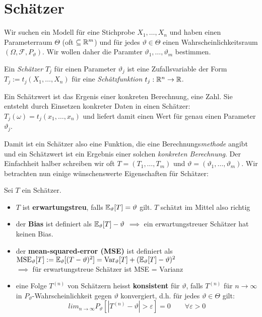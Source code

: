 \section{Schätzer}
\renewcommand{\theta}{\vartheta}
Wir suchen ein Modell für eine Stichprobe $X_1,\dots, X_n$ und haben einen Parameterraum $\Theta$ (oft $\subseteq \mathbb{R}^m$) und für jedes $\theta \in \Theta$ einen Wahrscheinlichkeitsraum $(\Omega, \mathcal{F}, P_\theta)$. Wir wollen daher die Paramter $\theta_1,\dots,\theta_m$ bestimmen.
\begin{definition}
Ein \textit{Schätzer} $T_j$ für einen Parameter $\theta_j$ ist eine Zufallsvariable der Form $T_j := t_j(X_1,\dots,X_n)$ für eine \textit{Schätzfunktion} $t_j: \mathbb{R}^n \to \mathbb{R}$.
\end{definition}
\begin{definition}
Ein Schätzwert ist das Ergenis einer konkreten Berechnung, eine Zahl. Sie entsteht durch Einsetzen konkreter Daten in einen Schätzer: $T_j(\omega) = t_j(x_1,\dots,x_n)$ und liefert damit einen Wert für genau einen Parameter $\theta_j$.
\end{definition}
Damit ist ein Schätzer also eine Funktion, die eine Berechnungs\textit{methode} angibt und ein Schätzwert ist ein Ergebnis einer solchen \textit{konkreten Berechnung}. Der Einfachheit halber schreiben wir oft $T = (T_1,\dots,T_m)$ und $\theta = (\theta_1,\dots,\theta_m)$. Wir betrachten nun einige wünschenswerte Eigenschaften für Schätzer:

\begin{definition}
Sei $T$ ein Schätzer.
\begin{itemize}
\item $T$ ist \textbf{erwartungstreu}, falls $\E_\theta [T] = \theta$ gilt. $T$ schätzt im Mittel also richtig
\item der \textbf{Bias} ist definiert als $\E_\theta [T] - \theta$
$\implies$ ein erwartungstreuer Schätzer hat keinen Bias.
\item der \textbf{mean-squared-error (MSE)} ist definiert als $\mathrm{MSE}_\theta [T] := \E_\theta [(T-\theta)^2] = \mathrm{Var}_\theta[T] + (\E_\theta[T] - \theta)^2$\\
$\implies$ für erwartungstreue Schätzer ist MSE = Varianz
\item eine Folge $T^{(n)}$ von Schätzern heisst \textbf{konsistent} für $\theta$, falls $T^{(n)}$ für $n\to\infty$ in $P_\theta$-Wahrscheinlichkeit gegen $\theta$ konvergiert, d.h. für jedes $\theta \in \Theta$ gilt:
$$ lim_{n\to\infty} P_\theta \left[ |T^{(n)} - \theta | > \varepsilon\right] = 0 \quad \quad \forall \varepsilon >0$$
\end{itemize}
\end{definition}

